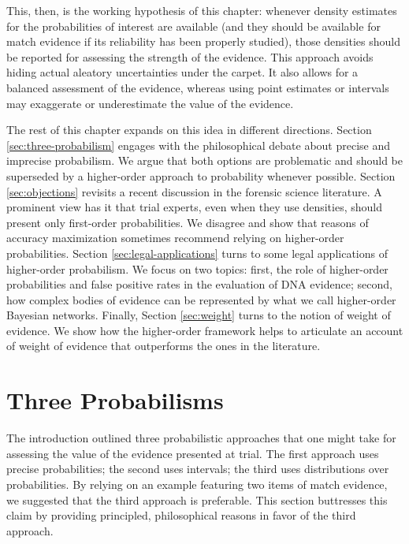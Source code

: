 \documentclass[
  10pt,
  dvipsnames,enabledeprecatedfontcommands]{scrartcl}
\begin{document}
This, then, is the working hypothesis of this chapter: whenever density
estimates for the probabilities of interest are available (and they
should be available for match evidence if its reliability has been
properly studied), those densities should be reported for assessing the
strength of the evidence. This approach avoids hiding actual aleatory
uncertainties under the carpet. It also allows for a balanced assessment
of the evidence, whereas using point estimates or intervals may
exaggerate or underestimate the value of the evidence.

The rest of this chapter expands on this idea in different directions.
Section \ref{sec:three-probabilism} engages with the philosophical
debate about precise and imprecise probabilism. We argue that both
options are problematic and should be superseded by a higher-order
approach to probability whenever possible. Section \ref{sec:objections}
revisits a recent discussion in the forensic science literature. A
prominent view has it that trial experts, even when they use densities,
should present only first-order probabilities. We disagree and show that
reasons of accuracy maximization sometimes recommend relying on
higher-order probabilities. Section \ref{sec:legal-applications} turns
to some legal applications of higher-order probabilism. We focus on two
topics: first, the role of higher-order probabilities and false positive
rates in the evaluation of DNA evidence; second, how complex bodies of
evidence can be represented by what we call higher-order Bayesian
networks. Finally, Section \ref{sec:weight} turns to the notion of
weight of evidence. We show how the higher-order framework helps to
articulate an account of weight of evidence that outperforms the ones in
the literature.

\hypertarget{three-probabilisms}{%
\section{Three Probabilisms}\label{three-probabilisms}}

\label{sec:three-probabilism}

The introduction outlined three probabilistic approaches that one might
take for assessing the value of the evidence presented at trial. The
first approach uses precise probabilities; the second uses intervals;
the third uses distributions over probabilities. By relying on an
example featuring two items of match evidence, we suggested that the
third approach is preferable. This section buttresses this claim by
providing principled, philosophical reasons in favor of the third
approach.
\end{document}
